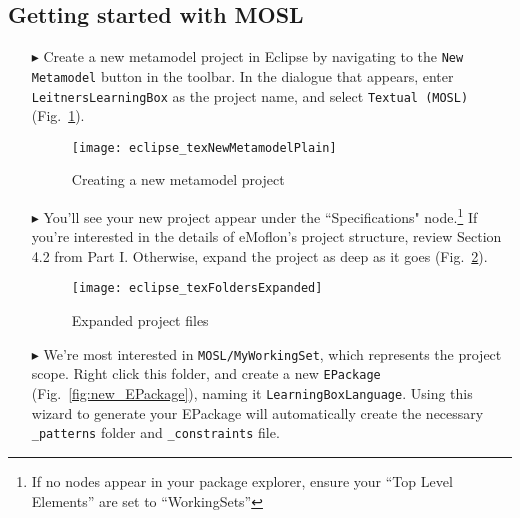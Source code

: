 \clearpage
\subsection{Getting started with MOSL}
\texHeader
\hypertarget{static:starting tex}{} 

\begin{itemize}

\item[$\blacktriangleright$] Create a new metamodel project in Eclipse by navigating to the \texttt{New Metamodel} button in the toolbar. In the dialogue that
appears, enter \texttt{LeitnersLearningBox} as the project name, and select \texttt{Textual (MOSL)}  (Fig.~\ref{fig:new_project}).

\vspace{1cm}

\begin{figure}[htbp]
	\centering
  \texttt{[image: eclipse\_texNewMetamodelPlain]}
	\caption{Creating a new metamodel project}
	\label{fig:new_project}
\end{figure}

\vspace{1cm}

\item[$\blacktriangleright$] You'll see your new project appear under the ``Specifications" node.\footnote{If no nodes appear in your package explorer,
ensure your ``Top Level Elements'' are set to ``WorkingSets''} If you're interested in the details of eMoflon's project structure, review Section
4.2 from Part I. Otherwise, expand the project as deep as it goes (Fig.~\ref{fig:expanded_folders}).

\clearpage

\begin{figure}[htbp]
	\centering
  \texttt{[image: eclipse\_texFoldersExpanded]}
	\caption{Expanded project files}
	\label{fig:expanded_folders}
\end{figure} 

\vspace{0.5cm}

\item[$\blacktriangleright$] We're most interested in \texttt{MOSL/MyWorkingSet}, which represents the project scope. Right click this folder, and create a new
\texttt{EPackage} (Fig.~\ref{fig:new_EPackage}), naming it \texttt{LearningBoxLanguage}. Using this wizard to generate your EPackage will automatically create
the necessary \texttt{\_patterns} folder and \texttt{\_constraints} file.


\end{itemize}
